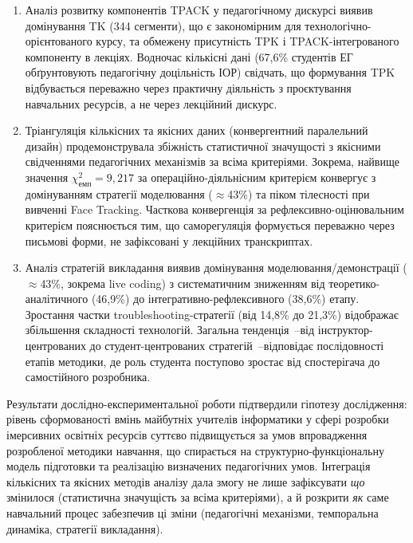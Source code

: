 \begin{enumerate}
\item Аналіз розвитку компонентів TPACK у педагогічному дискурсі виявив домінування TK (344 сегменти), що є закономірним для технологічно-орієнтованого курсу, та обмежену присутність TPK і TPACK-інтегрованого компоненту в лекціях. Водночас кількісні дані (67,6\% студентів ЕГ обґрунтовують педагогічну доцільність ІОР) свідчать, що формування TPK відбувається переважно через практичну діяльність з проєктування навчальних ресурсів, а не через лекційний дискурс.

\item Тріангуляція кількісних та якісних даних (конвергентний паралельний дизайн) продемонструвала збіжність статистичної значущості з якісними свідченнями педагогічних механізмів за всіма критеріями. Зокрема, найвище значення $\chi^2_{\text{емп}} = 9{,}217$ за операційно-діяльнісним критерієм конвергує з домінуванням стратегії моделювання ($\approx$43\%) та піком тілесності при вивченні Face Tracking. Часткова конвергенція за рефлексивно-оцінювальним критерієм пояснюється тим, що саморегуляція формується переважно через письмові форми, не зафіксовані у лекційних транскриптах.

\item Аналіз стратегій викладання виявив домінування моделювання/демонстрації ($\approx$43\%, зокрема live coding) з систематичним зниженням від теоретико-аналітичного (46,9\%) до інтегративно-рефлексивного (38,6\%) етапу. Зростання частки troubleshooting-стратегії (від 14,8\% до 21,3\%) відображає збільшення складності технологій. Загальна тенденція~--від інструктор-центрованих до студент-центрованих стратегій~--відповідає послідовності етапів методики, де роль студента поступово зростає від спостерігача до самостійного розробника.
\end{enumerate}

Результати дослідно-експериментальної роботи підтвердили гіпотезу дослідження: рівень сформованості вмінь майбутніх учителів інформатики у сфері розробки імерсивних освітніх ресурсів суттєво підвищується за умов впровадження розробленої методики навчання, що спирається на структурно-функціональну модель підготовки та реалізацію визначених педагогічних умов. Інтеграція кількісних та якісних методів аналізу дала змогу не лише зафіксувати \textit{що} змінилося (статистична значущість за всіма критеріями), а й розкрити \textit{як} саме навчальний процес забезпечив ці зміни (педагогічні механізми, темпоральна динаміка, стратегії викладання).
